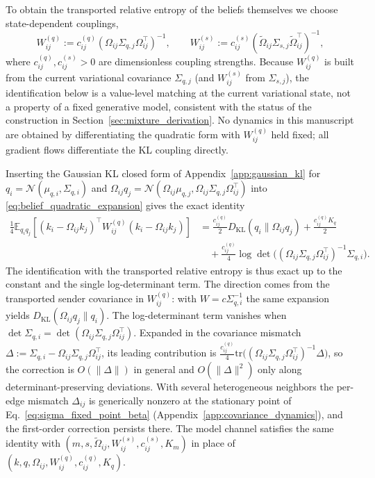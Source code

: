 \documentclass[11pt]{article}
\begin{document}
To obtain the transported relative entropy of the beliefs themselves we choose state-dependent couplings,
\begin{equation}
W^{(q)}_{ij}:=c^{(q)}_{ij}(\Omega_{ij}\Sigma_{q,j}\Omega_{ij}^\top)^{-1},
\qquad
W^{(s)}_{ij}:=c^{(s)}_{ij}(\tilde{\Omega}_{ij}\Sigma_{s,j}\tilde{\Omega}_{ij}^\top)^{-1},
\end{equation}
where $c^{(q)}_{ij}, c^{(s)}_{ij} > 0$ are dimensionless coupling strengths. Because $W^{(q)}_{ij}$ is built from the current variational covariance $\Sigma_{q,j}$ (and $W^{(s)}_{ij}$ from $\Sigma_{s,j}$), the identification below is a value-level matching at the current variational state, not a property of a fixed generative model, consistent with the status of the construction in Section~\ref{sec:mixture_derivation}. No dynamics in this manuscript are obtained by differentiating the quadratic form with $W^{(q)}_{ij}$ held fixed; all gradient flows differentiate the KL coupling directly.

Inserting the Gaussian KL closed form of Appendix~\ref{app:gaussian_kl} for $q_i = \mathcal{N}(\mu_{q,i},\Sigma_{q,i})$ and $\Omega_{ij}q_j = \mathcal{N}(\Omega_{ij}\mu_{q,j}, \Omega_{ij}\Sigma_{q,j}\Omega_{ij}^\top)$ into \eqref{eq:belief_quadratic_expansion} gives the exact identity
\begin{equation}
\begin{aligned}
\frac{1}{4}\mathbb{E}_{q_i q_j}
[(k_i-\Omega_{ij}k_j)^\top W^{(q)}_{ij}(k_i-\Omega_{ij}k_j)]
&=
\frac{c^{(q)}_{ij}}{2}D_{\mathrm{KL}}(q_i\|\Omega_{ij}q_j)+\frac{c^{(q)}_{ij}K_q}{2}\\
&\quad+\frac{c^{(q)}_{ij}}{4}\log\det\big((\Omega_{ij}\Sigma_{q,j}\Omega_{ij}^\top)^{-1}\Sigma_{q,i}\big).
\end{aligned}
\label{eq:quadratic_kl_identity}
\end{equation}
The identification with the transported relative entropy is thus exact up to the constant and the single log-determinant term. The direction comes from the transported sender covariance in $W^{(q)}_{ij}$: with $W = c\Sigma_{q,i}^{-1}$ the same expansion yields $D_{\mathrm{KL}}(\Omega_{ij}q_j\|q_i)$. The log-determinant term vanishes when $\det\Sigma_{q,i} = \det(\Omega_{ij}\Sigma_{q,j}\Omega_{ij}^\top)$. Expanded in the covariance mismatch $\Delta := \Sigma_{q,i} - \Omega_{ij}\Sigma_{q,j}\Omega_{ij}^\top$, its leading contribution is $\tfrac{c^{(q)}_{ij}}{4}\mathrm{tr}\big((\Omega_{ij}\Sigma_{q,j}\Omega_{ij}^\top)^{-1}\Delta\big)$, so the correction is $O(\|\Delta\|)$ in general and $O(\|\Delta\|^2)$ only along determinant-preserving deviations. With several heterogeneous neighbors the per-edge mismatch $\Delta_{ij}$ is generically nonzero at the stationary point of Eq.~\eqref{eq:sigma_fixed_point_beta} (Appendix~\ref{app:covariance_dynamics}), and the first-order correction persists there. The model channel satisfies the same identity with $(m, s, \tilde\Omega_{ij}, W^{(s)}_{ij}, c^{(s)}_{ij}, K_m)$ in place of $(k, q, \Omega_{ij}, W^{(q)}_{ij}, c^{(q)}_{ij}, K_q)$.
\end{document}
